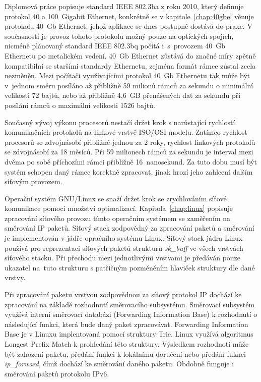 \documentclass[english]{fitthesis} %
\begin{document}
  \maketitle

Diplomová práce popisuje standard IEEE 802.3ba z roku 2010, který definuje protokol 40 a 100~Gigabit Ethernet,
konkrétně se v kapitole~\ref{chap:40gbe} věnuje protokolu 40~Gb Ethernet, jehož aplikace se dnes postupně dostává do praxe.
V současnosti je provoz tohoto protokolu možný pouze na optických spojích, nicméně plánovaný standard IEEE 802.3bq
počítá i~s~provozem 40~Gb Ethernetu po metalickém vedení.
40~Gb Ethernet zůstává do značné míry zpětně kompatibilní se staršími standardy Ethernetu, zejména
formát rámce zůstal zcela nezměněn.
Mezi počítači využívajícími protokol 40~Gb Ethernetu tak může být v~jednom směru posíláno
až přibližně 59 milionů rámců za sekundu o minimální velikosti 72 bajtů,
nebo až přibližně 4,6~GB přenášených dat za sekundu při posílání rámců o maximální velikosti 1526 bajtů.

Současný vývoj výkonu procesorů nestačí držet krok s narůstající
rychlostí komunikačních protokolů na linkové vrstvě ISO/OSI modelu.
Zatímco rychlost procesorů se zdvojnásobí přibližně jednou za 2 roky, rychlost linkových protokolů se zdvojnásobí za 18 měsíců.
Při 59 milionech rámců za sekundu je interval mezi dvěma po sobě příchozími rámci přibližně 16~nanosekund.
Za tuto dobu musí být systém schopen daný rámec korektně zpracovat, jinak hrozí jeho zahlcení dalším síťovým provozem.

Operační systém GNU/Linux se snaží držet krok se zrychlováním síťové komunikace pomocí množství optimalizací.
Kapitola~\ref{chap:linux} popisuje zpracování síťového provozu tímto operačním systémem se zaměřením na směrování IP paketů.
Síťový stack zodpovědný za zpracování paketů a směrování je implementován v jádře opračního systému Linux.
Síťový stack jádra Linux používá pro reprezentaci síťových paketů
strukturu {\it{sk\_buff}} ve všech vrstvách síťového stacku.
Při přechodu mezi jednotlivými vrstvami je předáván pouze ukazatel na~tuto strukturu
s patřičným pozměněním hlaviček struktury dle dané vrstvy.

Při zpracování paketu vrstvou zodpovědnou za síťový protokol IP dochází ke zpracování na základě rozhodnutí směrovacího subsystému.
Směrovací subsystém využívá interní směrovací databázi (Forwarding Information Base) k rozhodnutí o
následující funkci, která bude daný paket zpracovávat.
Forwarding Information Base je v Linuxu implentovaná pomocí struktury Trie.
Linux využívá algoritmus Longest Prefix Match k prohledání této struktury.
Výsledkem rozhodnotí může být zahození paketu, předání funkci k lokálnímu doručení nebo
předání fuknci {\it{ip\_forward}}, čímž dochází ke směrování daného paketu.
Obdobně funguje i směrování paketů protokolu IPv6.
\end{document}
